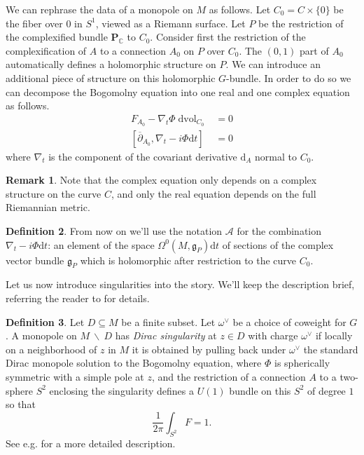 \documentclass[11pt, oneside, reqno]{amsart}
\theoremstyle{definition} \newtheorem{definition}{Definition}[section]
\theoremstyle{definition} \newtheorem{remark}[definition]{Remark}
\theoremstyle{definition} \newtheorem{remarks}[definition]{Remarks}
\theoremstyle{definition} \newtheorem{question}[definition]{Question}
\theoremstyle{definition} \newtheorem*{note}{Note}
\theoremstyle{definition} \newtheorem{example}[definition]{Example}
\theoremstyle{definition} \newtheorem{examples}[definition]{Examples}
\renewcommand{\gg}{\mathfrak{g}}
\newcommand{\mc}[1]{\mathcal{#1}}
\newcommand{\bo}[1]{\boldsymbol{#1}}
\newcommand{\bs}{\ \backslash \ }
\newcommand{\del}{\partial}
\newcommand{\ol}[1]{\overline{#1}}
\newcommand{\CC}{\mathbb{C}}
\newcommand{\sub}{\subseteq}
\DeclareMathOperator{\dvol}{dvol}
\renewcommand{\d}{\mathrm{d}}
\begin{document}
We can rephrase the data of a monopole on $M$ as follows.  Let $C_0 = C \times \{0\}$ be the fiber over $0$ in $S^1$, viewed as a Riemann surface.  Let $P$ be the restriction of the complexified bundle $\bo P_\CC$ to $C_0$.  Consider first the restriction of the complexification of $A$ to a connection $A_0$ on $P$ over $C_0$.  The $(0,1)$ part of $A_0$ automatically defines a holomorphic structure on $P$.  We can introduce an additional piece of structure on this holomorphic $G$-bundle.  In order to do so we can decompose the Bogomolny equation into one real and one complex equation as follows.
\begin{align*}
F_{A_0} - \nabla_t \Phi \dvol_{C_0} &= 0 \\
[\ol{\del}_{A_0}, \nabla_t - i\Phi \d t] &= 0 
\end{align*}
where $\nabla_t$ is the component of the covariant derivative $\d_A$ normal to $C_0$.  

\begin{remark}
Note that the complex equation only depends on a complex structure on the curve $C$, and only the real equation depends on the full Riemannian metric.
\end{remark}

\begin{definition} 
From now on we'll use the notation $\mc A$ for the combination $\nabla_t - i\Phi \d t$: an element of the space $\Omega^0(M, \gg_P)\d t$ of sections of the complex vector bundle $\gg_P$ which is holomorphic after restriction to the curve $C_0$. 
\end{definition}

Let us now introduce singularities into the story.  We'll keep the description brief, referring the reader to \cite{CharbonneauHurtubise, Smith} for details.
\begin{definition}
Let $D \sub M$ be a finite subset.  Let $\omega^\vee$ be a choice of coweight for $G$.  A monopole on $M \bs D$ has \emph{Dirac singularity} at $z \in D$ with charge $\omega^\vee$ if locally on a neighborhood of $z$ in $M$ it is obtained by pulling back under $\omega^\vee$ the standard Dirac monopole solution to the Bogomolny equation, where $\Phi$ is spherically symmetric with a simple pole at $z$, and the restriction of a connection $A$ to a two-sphere $S^2$ enclosing the singularity defines a $U(1)$ bundle on this $S^2$ of degree $1$ so that
    \[\frac{1}{2\pi} \int_{S^2} F = 1 .\]
  See e.g. \cite[Section 2.2]{CharbonneauHurtubise} for a more detailed description.
\end{definition}
\end{document}
